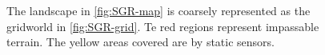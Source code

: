 \begin{figure}
{}


\caption{The landscape in \ref{fig:SGR-map} is coarsely represented as the gridworld in \ref{fig:SGR-grid}. Te red regions represent impassable terrain. The yellow areas covered are by static sensors.}\vspace{-0.5cm}
\label{fig:casestudy}
\end{figure}

